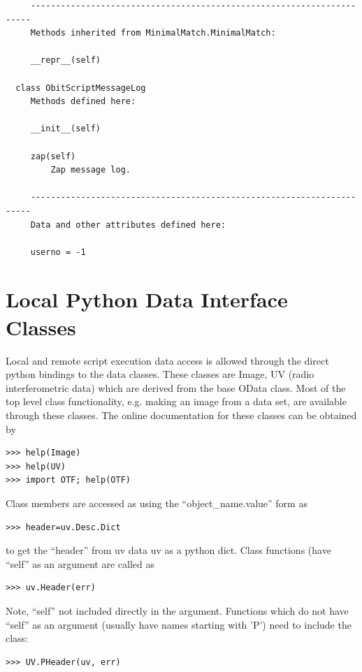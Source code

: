 \documentclass[11pt]{report}
\begin{document}
\begin{verbatim}
     ----------------------------------------------------------------------
     Methods inherited from MinimalMatch.MinimalMatch:
     
     __repr__(self)
    
  class ObitScriptMessageLog
     Methods defined here:
     
     __init__(self)
     
     zap(self)
         Zap message log.
     
     ----------------------------------------------------------------------
     Data and other attributes defined here:
     
     userno = -1
\end{verbatim}

\section{Local Python Data Interface Classes}
   Local and remote script execution data access is allowed through
the direct python bindings to the data classes.
These classes are Image, UV (radio interferometric data)
which are derived from the base OData class.
Most of the top level class functionality, e.g. making an image from a
data set, are available through these classes.
The online documentation for these classes can be obtained by
\begin{verbatim}
>>> help(Image)
>>> help(UV)
>>> import OTF; help(OTF)
\end{verbatim}
Class members are accessed as using the ``object\_name.value'' form as
\begin{verbatim}
>>> header=uv.Desc.Dict
\end{verbatim}
to get the ``header'' from uv data uv as a python dict.
Class functions (have ``self'' as an argument are called as
\begin{verbatim}
>>> uv.Header(err)
\end{verbatim}
Note, ``self'' not included directly in the argument.
Functions which do not have ``self'' as an argument (usually have
names starting with 'P') need to include
the class:
\begin{verbatim}
>>> UV.PHeader(uv, err)
\end{verbatim}
\end{document}
